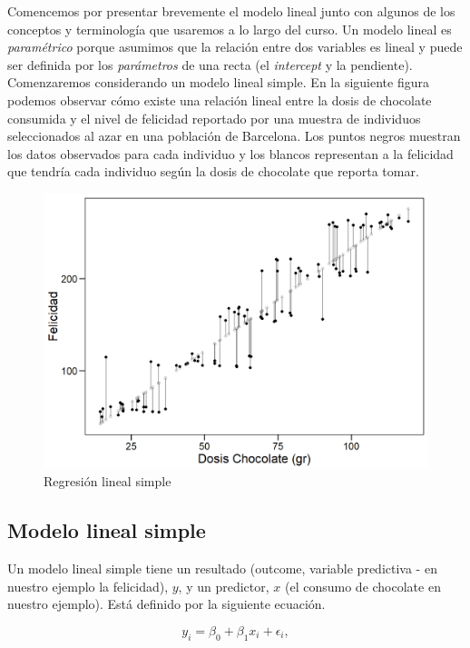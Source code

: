 \documentclass[
]{book}
\begin{document}
Comencemos por presentar brevemente el modelo lineal junto con algunos de los conceptos y terminología que usaremos a lo largo del curso. Un modelo lineal es \emph{paramétrico} porque asumimos que la relación entre dos variables es lineal y puede ser definida por los \emph{parámetros} de una recta (el \emph{intercept} y la pendiente). Comenzaremos considerando un modelo lineal simple. En la siguiente figura podemos observar cómo existe una relación lineal entre la dosis de chocolate consumida y el nivel de felicidad reportado por una muestra de individuos seleccionados al azar en una población de Barcelona. Los puntos negros muestran los datos observados para cada individuo y los blancos representan a la felicidad que tendría cada individuo según la dosis de chocolate que reporta tomar.

\begin{figure}
\centering
\includegraphics{figures/reg_lin.png}
\caption{Regresión lineal simple}
\end{figure}

\hypertarget{modelo-lineal-simple}{%
\subsection{Modelo lineal simple}\label{modelo-lineal-simple}}

Un modelo lineal simple tiene un resultado (outcome, variable predictiva - en nuestro ejemplo la felicidad), \(y\), y un predictor, \(x\) (el consumo de chocolate en nuestro ejemplo). Está definido por la siguiente ecuación.

\[
y_i = \beta_0 + \beta_1x_i + \epsilon_i,
\]
\end{document}
